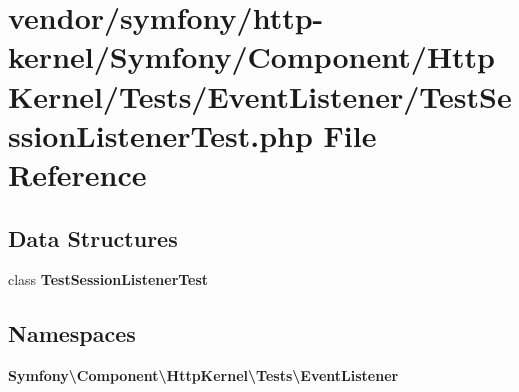 \section{vendor/symfony/http-\/kernel/\+Symfony/\+Component/\+Http\+Kernel/\+Tests/\+Event\+Listener/\+Test\+Session\+Listener\+Test.php File Reference}
\label{_test_session_listener_test_8php}
\subsection*{Data Structures}
\begin{DoxyCompactItemize}
\item 
class {\bf Test\+Session\+Listener\+Test}
\end{DoxyCompactItemize}
\subsection*{Namespaces}
\begin{DoxyCompactItemize}
\item 
 {\bf Symfony\textbackslash{}\+Component\textbackslash{}\+Http\+Kernel\textbackslash{}\+Tests\textbackslash{}\+Event\+Listener}
\end{DoxyCompactItemize}
